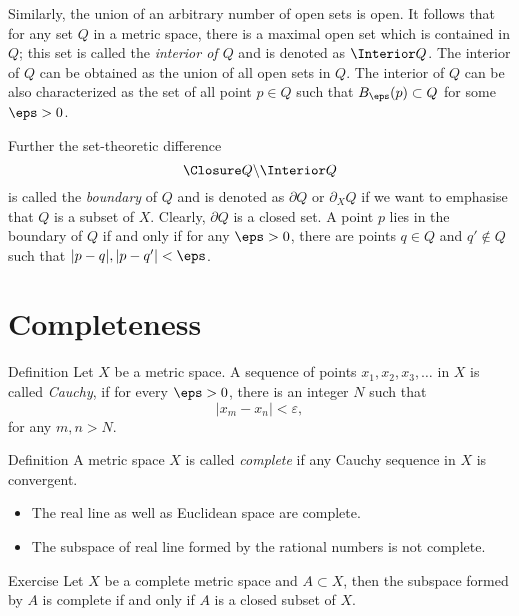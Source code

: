 Similarly, the union of an arbitrary number of open sets is open.
It follows that for any set $Q$ in a metric space, there is a maximal open set which is contained in $Q$;
this set is called the \emph{interior of $Q$} and is denoted as $\Interior Q$.
The interior of $Q$ can be obtained as the union of all open sets in $Q$.
The interior of $Q$ can be also characterized as the set of all point $p\in Q$ such that $B_\eps(p)\subset Q$ for some $\eps>0$.

Further the set-theoretic difference
$$\Closure Q\backslash \Interior Q$$
is called the \emph{boundary} of $Q$ and is denoted as $\partial Q$ or $\partial_X Q$ if we want to emphasise that $Q$ is a subset of $X$.
Clearly, $\partial Q$ is a closed set.
A point $p$ lies in the boundary of $Q$ if and only if for any $\eps>0$, there are points $q\in Q$ and $q'\notin Q$ such that $|p-q|,|p-q'|<\eps$.

\section*{Completeness}

\begin{thm}{Definition}
Let $X$ be a metric space.
A sequence of points $x_1, x_2, x_3, \ldots$ in $X$ is called \emph{Cauchy}, 
if for every $\eps>0$, 
there is an integer $N$ such that 
$$|x_m - x_n| < \varepsilon,$$
for any $m, n > N$.
\end{thm}

\begin{thm}{Definition}
A metric space $X$ is called \emph{complete} if any Cauchy sequence in $X$ is convergent.
\end{thm}

\begin{itemize}
\item The real line as well as Euclidean space are complete.
\item The subspace of real line formed by the rational numbers is not complete.
\end{itemize}

\begin{thm}{Exercise}\label{ex:close-complete}
Let $X$ be a complete metric space and $A\subset X$,
then the subspace formed by $A$ is complete if and only if $A$ is a closed subset of $X$.
\end{thm}



